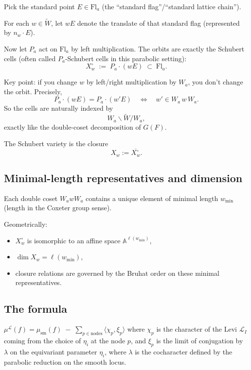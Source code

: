\documentclass[12pt]{article}
\begin{document}
Pick the standard point $E \in \mathrm{Fl}_a$ (the ``standard flag''/``standard lattice chain'').

For each $w \in \widetilde{W}$, let $wE$ denote the translate of that standard flag (represented by $n_w \cdot E$).

Now let $P_a$ act on $\mathrm{Fl}_a$ by left multiplication. The orbits are exactly the Schubert cells (often called $P_a$-Schubert cells in this parabolic setting):
\[
X_w^\circ \;:=\; P_a \cdot (wE) \;\subset\; \mathrm{Fl}_a.
\]

Key point: if you change $w$ by left/right multiplication by $W_a$, you don't change the orbit. Precisely,
\[
P_a \cdot (wE) = P_a \cdot (w'E)
\quad\Longleftrightarrow\quad
w' \in W_a\, w\, W_a.
\]
So the cells are naturally indexed by
\[
W_a \backslash \widetilde{W} / W_a,
\]
exactly like the double-coset decomposition of $G(F)$.

The Schubert variety is the closure
\[
X_w := \overline{X_w^\circ}.
\]


\subsection*{Minimal-length representatives and dimension}

Each double coset $W_a w W_a$ contains a unique element of minimal length $w_{\min}$ (length in the Coxeter group sense).

Geometrically:
\begin{itemize}
    \item $X_w^\circ$ is isomorphic to an affine space $\mathbb{A}^{\ell(w_{\min})}$,
    \item $\dim X_w = \ell(w_{\min})$,
    \item closure relations are governed by the Bruhat order on these minimal representatives.
\end{itemize}


\subsection{The formula}
$\mu^{\mathcal L}(f)
=
\mu_{\mathrm{sm}}(f)\;-\;\sum_{p\in \mathrm{nodes}}\langle \chi_p,\xi_p\rangle$ where $\chi_p$ is the character of the Levi $\mathcal{L}_I$ coming from the choice of $\eta_i$ at the node $p$, and $\xi_p$ is the limit of conjugation by $\lambda$ on the equivariant parameter $\eta_i$, where $\lambda$ is the cocharacter defined by the parabolic reduction on the smooth locus.
\end{document}
